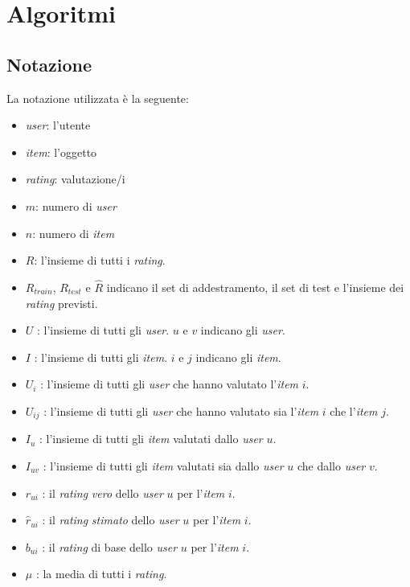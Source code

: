 \section{Algoritmi}\label{algoritmi}

\subsection{Notazione}\label{notazione}

La notazione utilizzata è la seguente:

\begin{itemize}
    \item \textit{user}: l'utente
    \item \textit{item}: l'oggetto
    \item \textit{rating}: valutazione/i
    \item $m$: numero di \textit{user}
    \item $n$: numero di \textit{item}
    \item $R$: l'insieme di tutti i \textit{rating}.
    \item $R_{train}$, $R_{test}$ e $\hat{R}$ indicano il set di addestramento, il set di test e l'insieme dei \textit{rating} previsti.
    \item $U$ : l'insieme di tutti gli \textit{user}. $u$ e $v$ indicano gli \textit{user}.
    \item $I$ : l'insieme di tutti gli \textit{item}. $i$ e $j$ indicano gli \textit{item}.
    \item $U_i$ : l'insieme di tutti gli \textit{user} che hanno valutato l'\textit{item} $i$.
    \item $U_{ij}$ : l'insieme di tutti gli \textit{user} che hanno valutato sia l'\textit{item} $i$ che l'\textit{item} $j$.
    \item $I_u$ : l'insieme di tutti gli \textit{item} valutati dallo \textit{user} $u$.
    \item $I_{uv}$ : l'insieme di tutti gli \textit{item} valutati sia dallo \textit{user} $u$ che dallo \textit{user} $v$.
    \item $r_{ui}$ : il \textit{rating} \textit{vero} dello \textit{user} $u$ per l'\textit{item} $i$.
    \item $\hat{r}_{ui}$ : il \textit{rating} \textit{stimato} dello \textit{user} $u$ per l'\textit{item} $i$.
    \item $b_{ui}$ : il \textit{rating} di base dello \textit{user} $u$ per l'\textit{item} $i$.
    \item $\mu$ : la media di tutti i \textit{rating}.

\end{itemize}
